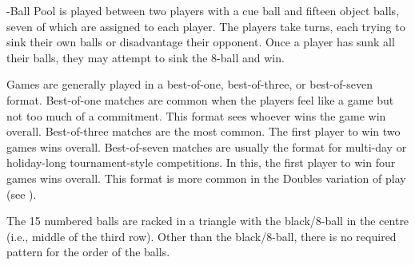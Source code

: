 

-Ball Pool is played between two players with a cue ball and fifteen object balls, seven of which are assigned to each player. The players take turns, each trying to sink their own balls or disadvantage their opponent. Once a player has sunk all their balls, they may attempt to sink the 8-ball and win.%


 Games are generally played in a best-of-one, best-of-three, or best-of-seven format.%
\subruleitem Best-of-one matches are common when the players feel like a game but not too much of a commitment. This format sees whoever wins the game win overall.%
\subruleitem Best-of-three matches are the most common. The first player to win two games wins overall.%
\subruleitem Best-of-seven matches are usually the format for multi-day or holiday-long tournament-style competitions. In this, the first player to win four games wins overall. This format is more common in the Doubles variation of play (see ).%


 {}%
\DetermineWhoRacks%
%
\subruleitem The 15 numbered balls are racked in a triangle with the black/8-ball in the centre (i.e., middle of the third row). Other than the black/8-ball, there is no required pattern for the order of the balls.%
\subruleitem \TightlyPacked%
\subruleitem {}%
\subruleitem {}%
\subruleitem {}%


